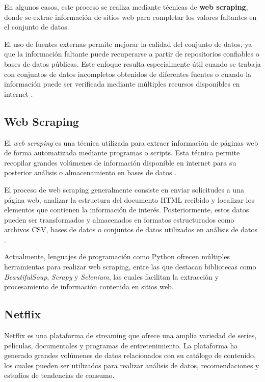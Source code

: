\documentclass[12pt]{article}
\begin{document}
En algunos casos, este proceso se realiza mediante técnicas de \textbf{web scraping}, donde se 
extrae información de sitios web para completar los valores faltantes en el conjunto de datos.

El uso de fuentes externas permite mejorar la calidad del conjunto de datos, ya que la información 
faltante puede recuperarse a partir de repositorios confiables o bases de datos públicas. Este 
enfoque resulta especialmente útil cuando se trabaja con conjuntos de datos incompletos obtenidos 
de diferentes fuentes o cuando la información puede ser verificada mediante múltiples recursos 
disponibles en internet \cite{hastie2009elements}.
\vspace{1.5cm}
\subsection{Web Scraping}

El \textit{web scraping} es una técnica utilizada para extraer información de páginas web de forma 
automatizada mediante programas o scripts. Esta técnica permite recopilar grandes volúmenes de 
información disponible en internet para su posterior análisis o almacenamiento en bases de datos 
\cite{mitchell2018webscraping}.

El proceso de web scraping generalmente consiste en enviar solicitudes a una página web, analizar 
la estructura del documento HTML recibido y localizar los elementos que contienen la información 
de interés. Posteriormente, estos datos pueden ser transformados y almacenados en formatos 
estructurados como archivos CSV, bases de datos o conjuntos de datos utilizados en análisis de 
datos \cite{mitchell2018webscraping}.

Actualmente, lenguajes de programación como Python ofrecen múltiples herramientas para realizar 
web scraping, entre las que destacan bibliotecas como \textit{BeautifulSoup}, \textit{Scrapy} y 
\textit{Selenium}, las cuales facilitan la extracción y procesamiento de información contenida en 
sitios web.

\subsection{Netflix}

Netflix es una plataforma de streaming que ofrece una amplia variedad de series, películas, 
documentales y programas de entretenimiento. La plataforma ha generado grandes volúmenes de 
datos relacionados con su catálogo de contenido, los cuales pueden ser utilizados para realizar 
análisis de datos, recomendaciones y estudios de tendencias de consumo.
\end{document}
